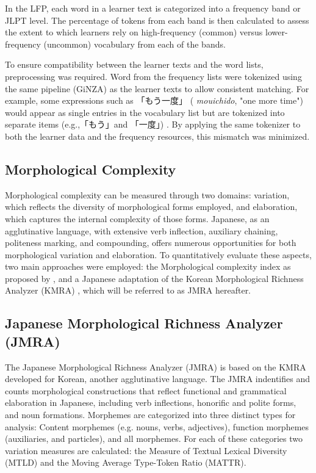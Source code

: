 In the LFP, each word in a learner text is categorized into a frequency band or JLPT level. The percentage of tokens
from each band is then calculated to assess the extent to which learners rely on high-frequency (common) versus
lower-frequency (uncommon) vocabulary from
each of the bands.

To ensure compatibility between the learner texts and the word lists, preprocessing was required. Word from the
frequency lists were tokenized using the same pipeline (GiNZA) as the learner texts to allow consistent matching.
 For example, some expressions such as
「もう一度」 (
\textit{mouichido}, "one more time") would appear as single entries in the vocabulary list but are tokenized
into separate
items (e.g.,「もう」and 「一度」) . By applying the same tokenizer to both the learner data and the frequency resources, this
mismatch was minimized.


\subsection{Morphological Complexity}
Morphological complexity can be measured through two domains: variation, which reflects the diversity of morphological
forms employed, and
elaboration, which captures the internal complexity of those forms. Japanese, as an
agglutinative
language, with extensive verb inflection, auxiliary chaining, politeness marking, and compounding,
offers
numerous opportunities for both morphological variation and elaboration. To quantitatively evaluate these aspects, two
main
approaches were employed: the Morphological complexity index as proposed by
\citet{Brezina2019}, and a Japanese adaptation of the Korean Morphological Richness Analyzer (KMRA) \citet{Hwang2024}, which will be
referred to as
JMRA hereafter.


\subsection{Japanese Morphological Richness Analyzer (JMRA)}

The Japanese Morphological Richness Analyzer (JMRA) is based on the KMRA developed for Korean, another
agglutinative language. The JMRA indentifies and counts morphological constructions that reflect
functional and grammatical elaboration in Japanese, including verb inflections, honorific and polite forms, and noun
formations.
Morphemes
are categorized into three distinct types for analysis: Content morphemes (e.g. nouns, verbs, adjectives),
function
morphemes (auxiliaries, and particles), and all morphemes. For each of these categories two variation measures are
calculated: the
Measure of Textual Lexical Diversity (MTLD) and the Moving Average Type-Token Ratio (MATTR).

